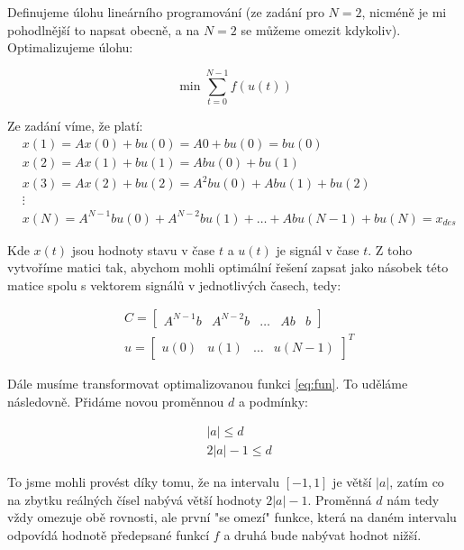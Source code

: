 \documentclass[10pt,a4paper,openright]{article}
\begin{document}
Definujeme úlohu lineárního programování (ze zadání pro $N=2$, nicméně je mi pohodlnější to napsat obecně,
a na $N=2$ se můžeme omezit kdykoliv). Optimalizujeme úlohu:

\begin{equation}
\min \sum_{t=0}^{N-1} f(u(t))
\end{equation}

Ze zadání víme, že platí:
\begin{equation}
	\begin{split}
		&x(1) = Ax(0) + bu(0) = A0 + bu(0) = bu(0)\\
		&x(2) = Ax(1) + bu(1) = Abu(0) + bu(1)\\
		&x(3) = Ax(2) + bu(2) = A^2bu(0) + Abu(1) + bu(2)\\
		&\vdots\\
		&x(N) = A^{N-1}bu(0) + A^{N-2}bu(1) + \hdots + Abu(N-1) + bu(N) = x_{des}
	\end{split}
\end{equation}

Kde $x(t)$ jsou hodnoty stavu v čase $t$ a $u(t)$ je signál v čase $t$. Z toho vytvoříme matici tak, abychom mohli optimální řešení zapsat jako násobek této matice
spolu s vektorem signálů v jednotlivých časech, tedy:

\begin{equation}\label{eq:defs}
	\begin{split}
	&C = \begin{bmatrix}A^{N-1}b & A^{N-2}b & \hdots & Ab & b \end{bmatrix}\\
	&u = \begin{bmatrix}u(0) & u(1) & \hdots & u(N-1)\end{bmatrix}^T
	\end{split}
\end{equation}

Dále musíme transformovat optimalizovanou funkci \ref{eq:fun}. 
To uděláme následovně. Přidáme novou proměnnou $d$ a podmínky:

\begin{equation}\label{eq:limits}
	\begin{split}
	&|a| \leq d\\
	&2|a| - 1 \leq d
	\end{split}
\end{equation}

To jsme mohli provést díky tomu, že na intervalu $[-1,1]$ je větší $|a|$,
zatím co na zbytku reálných čísel nabývá větší hodnoty $2|a| - 1$.
Proměnná $d$ nám tedy vždy omezuje obě rovnosti, ale první "se omezí" funkce,
která na daném intervalu odpovídá hodnotě předepsané funkcí $f$ a druhá bude nabývat hodnot nižší.
\end{document}
